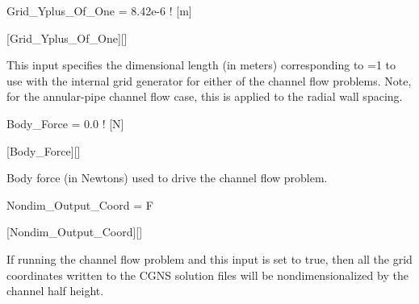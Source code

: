 
\begin{nmldescitem}
Grid_Yplus_Of_One = 8.42e-6  ! [m]
\end{nmldescitem}
[Grid\_Yplus\_Of\_One][]

\begin{nmldescbody}
This input specifies the dimensional length (in meters) corresponding to
\yp{}=1 to use with the internal grid generator for either of the channel flow
problems.
%
Note, for the annular-pipe channel flow case, this is applied to the radial wall
spacing.
\end{nmldescbody}


\begin{nmldescitem}
Body_Force = 0.0  ! [N]
\end{nmldescitem}
[Body\_Force][]

\begin{nmldescbody}
Body force (in Newtons) used to drive the channel flow problem.
\end{nmldescbody}


\begin{nmldescitem}
Nondim_Output_Coord = F
\end{nmldescitem}
[Nondim\_Output\_Coord][]

\begin{nmldescbody}
If running the channel flow problem and this input is set to true,
then all the grid coordinates written to the CGNS solution files
will be nondimensionalized by the channel half height.
\end{nmldescbody}


%
%
%
%


